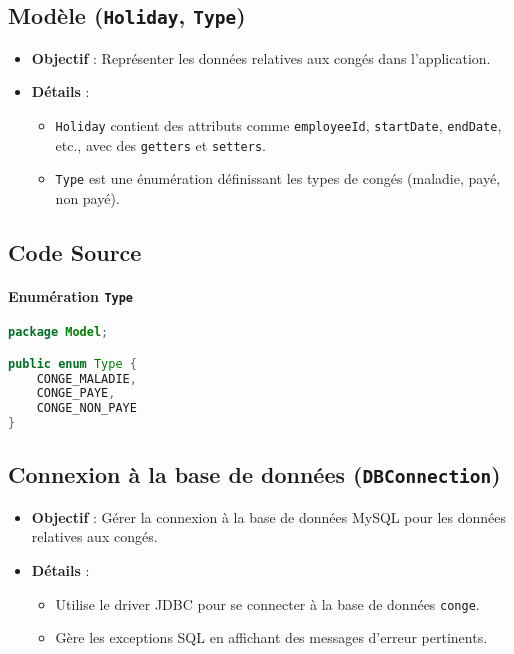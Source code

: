 \documentclass[a4paper,12pt]{article}
\begin{document}
\subsection{Modèle (\texttt{Holiday}, \texttt{Type})}
\begin{itemize}
    \item \textbf{Objectif} : Représenter les données relatives aux congés dans l'application.
    \item \textbf{Détails} :
    \begin{itemize}
        \item \texttt{Holiday} contient des attributs comme \texttt{employeeId}, \texttt{startDate}, \texttt{endDate}, etc., avec des \texttt{getters} et \texttt{setters}.
        \item \texttt{Type} est une énumération définissant les types de congés (maladie, payé, non payé).
    \end{itemize}
\end{itemize}

\subsection{Code Source}

\paragraph{Enumération \texttt{Type}}
\begin{lstlisting}[language=Java, caption={Enumération Type}, label={lst:type}]
package Model;

public enum Type {
    CONGE_MALADIE,
    CONGE_PAYE,
    CONGE_NON_PAYE
}
\end{lstlisting}

\subsection{Connexion à la base de données (\texttt{DBConnection})}
\begin{itemize}
    \item \textbf{Objectif} : Gérer la connexion à la base de données MySQL pour les données relatives aux congés.
    \item \textbf{Détails} :
    \begin{itemize}
        \item Utilise le driver JDBC pour se connecter à la base de données \texttt{conge}.
        \item Gère les exceptions SQL en affichant des messages d'erreur pertinents.
    \end{itemize}
\end{itemize}
\end{document}
